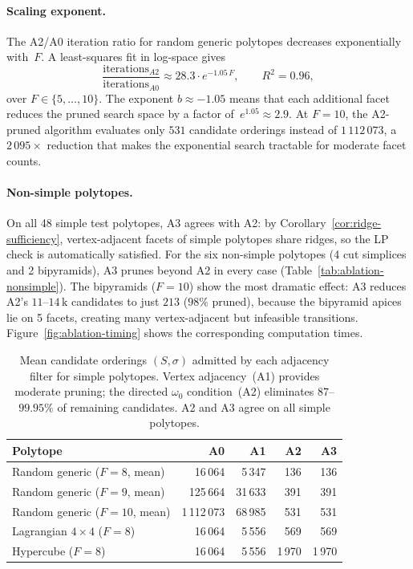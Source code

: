 \paragraph{Scaling exponent.}
The A2/A0 iteration ratio for random generic polytopes
decreases exponentially with~$F$.
A least-squares fit in log-space gives
\[
  \frac{\text{iterations}_{A2}}{\text{iterations}_{A0}} \approx 28.3 \cdot e^{-1.05\, F},
  \qquad R^2 = 0.96,
\]
over $F \in \{5, \ldots, 10\}$.
The exponent $b \approx -1.05$ means that each additional facet
reduces the pruned search space by a factor of~$e^{1.05} \approx 2.9$.
At $F = 10$, the A2-pruned algorithm evaluates only $531$ candidate orderings
instead of $1\,112\,073$, a $2\,095{\times}$ reduction that makes
the exponential search tractable for moderate facet counts.

\paragraph{Non-simple polytopes.}
On all 48 simple test polytopes, A3 agrees with A2:
by Corollary~\ref{cor:ridge-sufficiency},
vertex-adjacent facets of simple polytopes share ridges,
so the LP check is automatically satisfied.
For the six non-simple polytopes (4 cut simplices and 2 bipyramids),
A3 prunes beyond A2 in every case
(Table~\ref{tab:ablation-nonsimple}).
The bipyramids ($F = 10$) show the most dramatic effect:
A3 reduces A2's $11$--$14\,\text{k}$ candidates to just $213$ ($98\%$ pruned),
because the bipyramid apices lie on 5 facets, creating many
vertex-adjacent but infeasible transitions.
Figure~\ref{fig:ablation-timing} shows the corresponding computation times.

\begin{table}[h]
\centering
\begin{tabular}{lrrrr}
\toprule
Polytope & A0 & A1 & A2 & A3 \\
\midrule
Random generic ($F = 8$, mean)       & 16\,064 & 5\,347 & 136 & 136 \\
Random generic ($F = 9$, mean)       & 125\,664 & 31\,633 & 391 & 391 \\
Random generic ($F = 10$, mean)      & 1\,112\,073 & 68\,985 & 531 & 531 \\
Lagrangian $4 \times 4$ ($F = 8$)    & 16\,064 & 5\,556 & 569 & 569 \\
Hypercube ($F = 8$)                  & 16\,064 & 5\,556 & 1\,970 & 1\,970 \\
\bottomrule
\end{tabular}
\caption{Mean candidate orderings $(S, \sigma)$ admitted by each
  adjacency filter for simple polytopes.
  Vertex adjacency~(A1) provides moderate pruning;
  the directed $\omega_0$ condition~(A2) eliminates $87$--$99.95\%$
  of remaining candidates.
  A2 and A3 agree on all simple polytopes.}
\label{tab:ablation-iterations}
\end{table}

